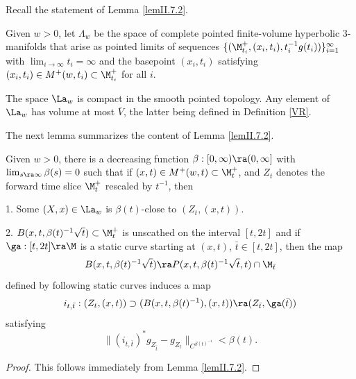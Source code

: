 Recall the statement of Lemma \ref{lemII.7.2}.

\begin{definition}
  \label{def:kl-hyperbolic-rigidity-stabilization-thick-part-hyperbolic-pointed-limit-space}

Given $w >0$, let $\Lambda_w$ be the space
of complete pointed finite-volume hyperbolic
$3$-manifolds that arise as pointed limits of
sequences $\{(\M^+_{t_i}, (x_i, t_i), t_i^{-1} g(t_i))\}_{i=1}^\infty$
with $\lim_{i \rightarrow \infty} t_i = \infty$ and the basepoint
$(x_i,t_i)$ satisfying
$(x_i,t_i) \in M^+(w, t_i) \subset \M^+_{t_i}$
for all $i$.
\end{definition}

The space $\La_w$ is compact in the smooth pointed topology.
Any element of $\La_w$ has volume at most $\overline{V}$,
the latter being defined in Definition \ref{VR}.

The next lemma summarizes the content of Lemma \ref{lemII.7.2}.

\bigskip
\begin{lemma}
  \label{lem:kl-hyperbolic-rigidity-stabilization-thick-part-existence-cap-geometry}

\label{II.7.2again}
Given $w>0$, there is a decreasing function
$\beta:[0,\infty)\ra (0,\infty]$
with $\lim_{s\ra\infty}\beta(s)=0$ such that
if
$(x,t)\in M^+(w,t)\subset\M_t^+$,
and  $Z_t$ denotes
the forward time slice
$\M_t^+$ rescaled by $t^{-1}$, then

1.  Some $(X,x)\in \La_w$
is $\beta(t)$-close to $(Z_t,(x,t))$.

2.
$B(x,t,\beta(t)^{-1}\sqrt{t})\subset \M_t^+$
is unscathed
on the interval $[t,2t]$ and if $\ga:[t,2t]\ra \M$ is a static
curve starting at $(x,t)$, $\bar t\in [t,2t]$, then the map
\begin{equation}
B(x,t,\beta(t)^{-1}\sqrt{t})\ra
P(x,t,\beta(t)^{-1}\sqrt{t},t)\cap\M_{\bar t}
\end{equation}
defined by following static curves induces a map
\begin{equation}
i_{t,\bar t}:(Z_t,(x,t))\supset (B(x,t,\beta(t)^{-1}),(x,t))
\ra (Z_{\bar t},\ga(\bar t))
\end{equation}
satisfying
\begin{equation}
\|\left(i_{t,\bar t}\right)^*g_{Z_{\bar
t}}-g_{Z_t}\|_{C^{\beta(t)^{-1}}}
<\beta(t).
\end{equation}
\end{lemma}
\begin{proof}
This follows immediately from Lemma \ref{lemII.7.2}.
\end{proof}

